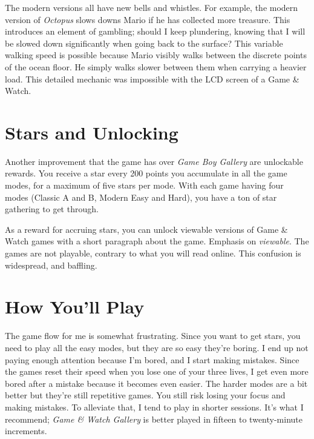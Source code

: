 \documentclass{book}
\begin{document}
\begin{minipage}{0.45\linewidth}\captionsetup{labelformat=empty}\end{minipage}\vspace{2pt}
\begin{minipage}{0.45\linewidth}\captionsetup{labelformat=empty}\end{minipage}
\par\justifying
The modern versions all have new bells and whistles. For example, the modern version of \emph{Octopus} slows downs Mario if he has collected more treasure. This introduces an element of gambling; should I keep plundering, knowing that I will be slowed down significantly when going back to the surface? This variable walking speed is possible because Mario visibly walks between the discrete points of the ocean floor. He simply walks slower between them when carrying a heavier load. This detailed mechanic was impossible with the LCD screen of a Game \& Watch.\par
\FloatBarrier\section*{Stars and Unlocking}
Another improvement that the game has over \emph{Game Boy Gallery} are unlockable rewards. You receive a star every 200 points you accumulate in all the game modes, for a maximum of five stars per mode. With each game having four modes (Classic A and B, Modern Easy and Hard), you have a ton of star gathering to get through.\par
As a reward for accruing stars, you can unlock viewable versions of Game \& Watch games with a short paragraph about the game. Emphasis on \emph{viewable}. The games are not playable, contrary to what you will read online. This confusion is widespread, and baffling.\par
\FloatBarrier\section*{How You’ll Play}
The game flow for me is somewhat frustrating. Since you want to get stars, you need to play all the easy modes, but they are so easy they’re boring. I end up not paying enough attention because I’m bored, and I start making mistakes. Since the games reset their speed when you lose one of your three lives, I get even more bored after a mistake because it becomes even easier. The harder modes are a bit better but they’re still repetitive games. You still risk losing your focus and making mistakes. To alleviate that, I tend to play in shorter sessions. It’s what I recommend; \emph{Game \& Watch Gallery} is better played in fifteen to twenty-minute increments.\par
\end{document}
